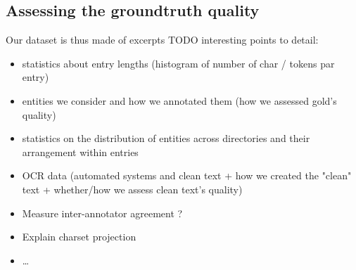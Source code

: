 \subsection{Assessing the groundtruth quality}
Our dataset is thus made of excerpts TODO interesting points to detail:

\begin{itemize}
    \item statistics about entry lengths (histogram of number of char / tokens par entry)
    \item entities we consider and how we annotated them (how we assessed gold's quality)
    \item statistics on the distribution of entities across directories and their arrangement within entries
    \item OCR data (automated systems and clean text + how we created the "clean" text + whether/how we assess clean text's quality)
    \item Measure inter-annotator agreement ? 
    \item Explain charset projection
    \item \dots
\end{itemize}
